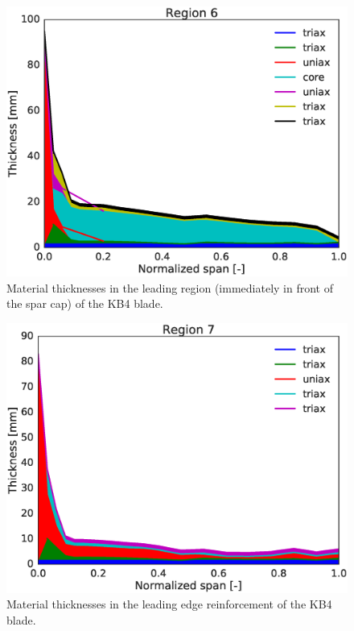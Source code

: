 \begin{figure}[!ht]
\begin{center}
	\includegraphics[width=.85\linewidth]{figures/KB4_laminate_layers_r06.eps}
\end{center}
\caption{Material thicknesses in the leading region (immediately in front of the spar cap) of the KB4 blade.}
\label{fig:KB4matstackr06}
\end{figure}

\begin{figure}[!ht]
\begin{center}
	\includegraphics[width=.85\linewidth]{figures/KB4_laminate_layers_r07.eps}
\end{center}
\caption{Material thicknesses in the leading edge reinforcement of the KB4 blade.}
\label{fig:KB4matstackr07}
\end{figure}

